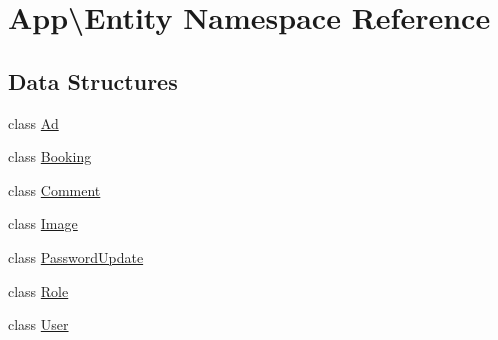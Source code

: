 \hypertarget{namespace_app_1_1_entity}{}\section{App\textbackslash{}Entity Namespace Reference}
\label{namespace_app_1_1_entity}
\subsection*{Data Structures}
\begin{DoxyCompactItemize}
\item 
class \mbox{\hyperlink{class_app_1_1_entity_1_1_ad}{Ad}}
\item 
class \mbox{\hyperlink{class_app_1_1_entity_1_1_booking}{Booking}}
\item 
class \mbox{\hyperlink{class_app_1_1_entity_1_1_comment}{Comment}}
\item 
class \mbox{\hyperlink{class_app_1_1_entity_1_1_image}{Image}}
\item 
class \mbox{\hyperlink{class_app_1_1_entity_1_1_password_update}{Password\+Update}}
\item 
class \mbox{\hyperlink{class_app_1_1_entity_1_1_role}{Role}}
\item 
class \mbox{\hyperlink{class_app_1_1_entity_1_1_user}{User}}
\end{DoxyCompactItemize}
